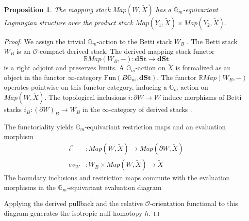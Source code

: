 \documentclass[reqno]{amsart}
\newcommand{\Gm}{\mathbb{G}_m}
\newcommand{\cO}{\mathcal{O}}
\newtheorem{proposition}[theorem]{Proposition}
\begin{document}
\begin{proposition}\label{prop:equiv_mapping_stack}
The mapping stack $Map(W, \widetilde{X})$ has a $\Gm$-equivariant Lagrangian structure over the product stack $Map(Y_{1}, \widetilde{X}) \times Map(Y_{2}, \widetilde{X})$.
\end{proposition}
\begin{proof}
We assign the trivial $\Gm$-action to the Betti stack $W_B$ \cite[Section 2.1]{PTVV}. The Betti stack $W_B$ is an $\cO$-compact derived stack. The derived mapping stack functor
\[
    \mathbb{R}Map(W_B, -) \colon \mathbf{dSt} \to \mathbf{dSt}
\]
is a right adjoint and preserves limits. A $\Gm$-action on $\widetilde{X}$ is formalized as an object in the functor $\infty$-category $\mathrm{Fun}(B\Gm, \mathbf{dSt})$. The functor $\mathbb{R}Map(W_B, -)$ operates pointwise on this functor category, inducing a $\Gm$-action on $Map(W, \widetilde{X})$. The topological inclusions $i \colon \partial W \to W$ induce morphisms of Betti stacks $i_B \colon (\partial W)_B \to W_B$ in the $\infty$-category of derived stacks \cite[Section 2.1]{PTVV}. 

The functoriality yields $\Gm$-equivariant restriction maps and an evaluation morphism
\begin{align*}
    i^* &\colon Map(W, \widetilde{X}) \to Map(\partial W, \widetilde{X}) \\
    ev_W &\colon W_B \times Map(W, \widetilde{X}) \to \widetilde{X}
\end{align*}
The boundary inclusions and restriction maps commute with the evaluation morphisms in the $\Gm$-equivariant evaluation diagram
\begin{center}
\end{center}
Applying the derived pullback and the relative $\cO$-orientation functional to this diagram generates the isotropic null-homotopy $h$.


\end{proof}
\end{document}
